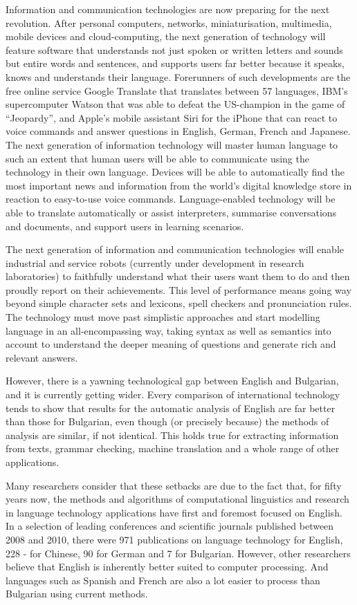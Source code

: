 \begin{multicols}{2}
Information and communication technologies are now preparing for the next revolution. After personal computers, networks, miniaturisation, multimedia, mobile devices and cloud-computing, the next generation of technology will feature software that understands not just spoken or written letters and sounds but entire words and sentences, and supports users far better because it speaks, knows and understands their language. Forerunners of such developments are the free online service Google Translate that translates between 57 languages, IBM’s supercomputer Watson that was able to defeat the US-champion in the game of “Jeopardy”, and Apple’s mobile assistant Siri for the iPhone that can react to voice commands and answer questions in English, German, French and Japanese. 
The next generation of information technology will master human language to such an extent that human users will be able to communicate using the technology in their own language. Devices will be able to automatically find the most important news and information from the world’s digital knowledge store in reaction to easy-to-use voice commands. Language-enabled technology will be able to translate automatically or assist interpreters, summarise conversations and documents, and support users in learning scenarios. 

The next generation of information and communication technologies will enable industrial and service robots (currently under development in research laboratories) to faithfully understand what their users want them to do and then proudly report on their achievements. This level of performance means going way beyond simple character sets and lexicons, spell checkers and pronunciation rules. The technology must move past simplistic approaches and start modelling language in an all-encompassing way, taking syntax as well as semantics into account to understand the deeper meaning of questions and generate rich and relevant answers.

However, there is a yawning technological gap between English and Bulgarian, and it is currently getting wider. Every comparison of international technology tends to show that results for the automatic analysis of English are far better than those for Bulgarian, even though (or precisely because) the methods of analysis are similar, if not identical. This holds true for extracting information from texts, grammar checking, machine translation and a whole range of other applications. 

Many researchers consider that these setbacks are due to the fact that, for fifty years now, the methods and algorithms of computational linguistics and research in language technology applications have first and foremost focused on English. In a selection of leading conferences and scientific journals published between 2008 and 2010, there were 971 publications on language technology for English, 228 - for Chinese, 90 for German and 7 for Bulgarian. However, other researchers believe that English is inherently better suited to computer processing. And languages such as Spanish and French are also a lot easier to process than Bulgarian using current methods.


\end{multicols}
